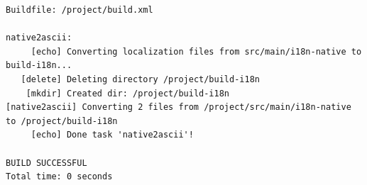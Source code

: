 \begin{lstlisting}[caption={Лог цели \texttt{native2ascii}},language={},captionpos=b]
Buildfile: /project/build.xml

native2ascii:
     [echo] Converting localization files from src/main/i18n-native to build-i18n...
   [delete] Deleting directory /project/build-i18n
    [mkdir] Created dir: /project/build-i18n
[native2ascii] Converting 2 files from /project/src/main/i18n-native to /project/build-i18n
     [echo] Done task 'native2ascii'!

BUILD SUCCESSFUL
Total time: 0 seconds
\end{lstlisting}